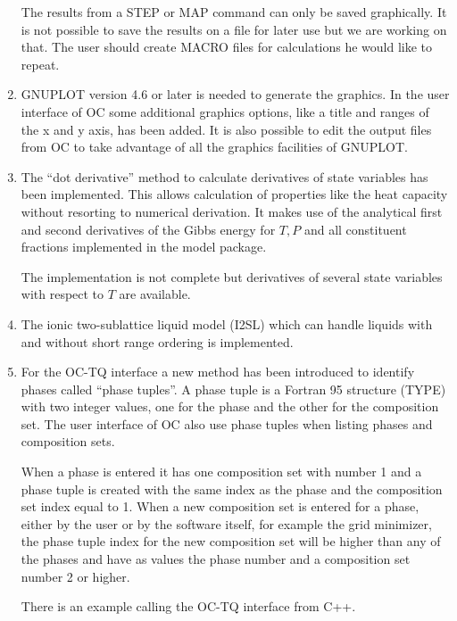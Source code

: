 \documentclass[12pt]{article}
\begin{document}
\begin{enumerate}
  The results from a STEP or MAP command can only be saved
  graphically.  It is not possible to save the results on a file for
  later use but we are working on that.  The user should create MACRO
  files for calculations he would like to repeat.

\item GNUPLOT version 4.6 or later is needed to generate the graphics.
  In the user interface of OC some additional graphics options, like a
  title and ranges of the x and y axis, has been added.  It is also
  possible to edit the output files from OC to take advantage of all
  the graphics facilities of GNUPLOT.


\item The ``dot derivative'' method to calculate derivatives of state
  variables has been implemented.  This allows calculation of
  properties like the heat capacity without resorting to numerical
  derivation.  It makes use of the analytical first and second
  derivatives of the Gibbs energy for $T, P$ and all constituent
  fractions implemented in the model package.

  The implementation is not complete but derivatives of several state
  variables with respect to $T$ are available.

\item The ionic two-sublattice liquid model (I2SL) which can handle
  liquids with and without short range ordering is implemented.

\item For the OC-TQ interface a new method has been introduced to
  identify phases called ``phase tuples''.  A phase tuple is a Fortran
  95 structure (TYPE) with two integer values, one for the phase and
  the other for the composition set.  The user interface of OC also
  use phase tuples when listing phases and composition sets.

  When a phase is entered it has one composition set with number 1 and
  a phase tuple is created with the same index as the phase and the
  composition set index equal to 1.  When a new composition set is
  entered for a phase, either by the user or by the software itself,
  for example the grid minimizer, the phase tuple index for the new
  composition set will be higher than any of the phases and have as
  values the phase number and a composition set number 2 or higher.

  There is an example calling the OC-TQ interface from C++.


\end{enumerate}
\end{document}
